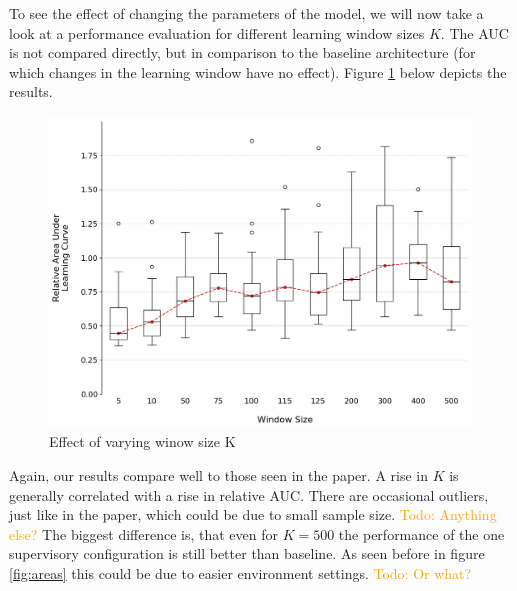 \documentclass[letterpaper]{article}
\newcommand\todo[1]{\textcolor{orange}{Todo: #1}}
\begin{document}
To see the effect of changing the parameters of the model, we will now take a look at a performance evaluation for different learning window sizes $K$. The AUC is not compared directly, but in comparison to the baseline architecture (for which changes in the learning window have no effect). Figure \ref{fig:windows} below depicts the results.
\begin{figure}[H]
 \begin{center}
  \includegraphics[width=\linewidth]{figures/figure4_extended}
  \caption{Effect of varying winow size K}
  \label{fig:windows}
 \end{center}
\end{figure}

Again, our results compare well to those seen in the paper. A rise in $K$ is generally correlated with a rise in relative AUC. There are occasional outliers, just like in the paper, which could be due to small sample size. \todo{Anything else?} The biggest difference is, that even for $K=500$ the performance of the one supervisory configuration is still better than baseline. As seen before in figure \ref{fig:areas} this could be due to easier environment settings. \todo{Or what?}
\end{document}
